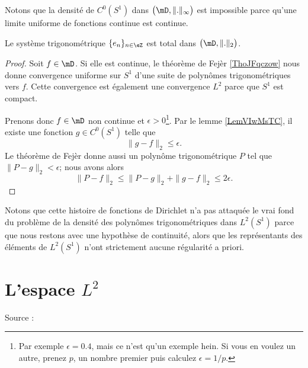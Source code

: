 Notons que la densité de \( C^0(S^1)\) dans \( \big( \mD,\| . \|_{\infty} \big)\) est impossible parce qu'une limite uniforme de fonctions continue est continue.

\begin{theorem}
    Le système trigonométrique \( \{ e_n \}_{n\in \eZ}\) est total dans \( \big( \mD,\| . \|_2 \big)\).
\end{theorem}

\begin{proof}
    Soit \( f\in\mD\). Si elle est continue, le théorème de Fejèr \ref{ThoJFqczow} nous donne convergence uniforme sur \( S^1\) d'une suite de polynômes trigonométriques vers \( f\). Cette convergence est également une convergence \( L^2\) parce que \( S^1\) est compact.

    Prenons donc \( f\in \mD\) non continue et \( \epsilon>0\)\footnote{Par exemple \( \epsilon=0.4\), mais ce n'est qu'un exemple hein. Si vous en voulez un autre, prenez \( p\), un nombre premier puis calculez \( \epsilon=1/p\).}. Par le lemme \ref{LemVIwMsTC}, il existe une fonction \( g\in C^0(S^1)\) telle que
    \begin{equation}
        \| g-f \|_2\leq \epsilon.
    \end{equation}
    Le théorème de Fejèr donne aussi un polynôme trigonométrique \( P\) tel que \( \| P-g \|_2<\epsilon\); nous avons alors
    \begin{equation}
        \| P-f \|_2\leq \| P-g \|_{2}+\| g-f \|_2\leq 2\epsilon.
    \end{equation}
\end{proof}

Notons que cette histoire de fonctions de Dirichlet n'a pas attaquée le vrai fond du problème de la densité des polynômes trigonométriques dans \(  L^2(S^1)\) parce que nous restons avec une hypothèse de continuité, alors que les représentants des éléments de \( L^2(S^1)\) n'ont strictement aucune régularité a priori.

\section{L'espace \texorpdfstring{$L^2$}{ L2}}
\label{SecNCSkgUK}

Source : \cite{MaureyHilbertFourier}

